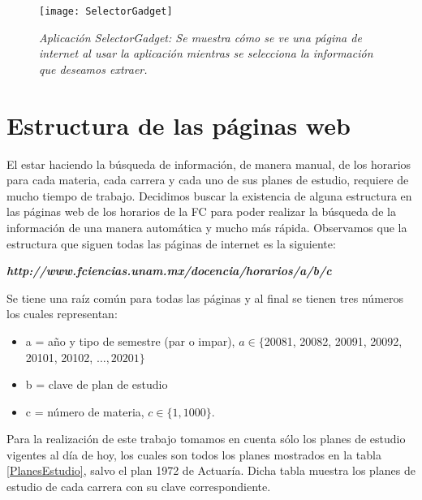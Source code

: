 \begin{figure}[H]
\centering
\texttt{[image: SelectorGadget]} %
\caption[\textit{Aplicación SelectorGadget}]{\textit{Aplicación SelectorGadget: Se muestra cómo se ve una página de internet al usar la aplicación mientras se selecciona la información que deseamos extraer.}}\label{appSelectorGadget}
\end{figure}

\section{Estructura de las páginas web}

El estar haciendo la búsqueda de información, de manera manual, de los horarios para cada materia, cada carrera y cada uno de sus planes de estudio, requiere de mucho tiempo de trabajo. Decidimos buscar la existencia de alguna estructura en las páginas web de los horarios de la FC para poder realizar la búsqueda de la información de una manera automática y mucho más rápida. Observamos que la estructura que siguen todas las páginas de internet es la siguiente:

\begin{center}
\textit{\textbf{http://www.fciencias.unam.mx/docencia/horarios/a/b/c}}
\end{center}

Se tiene una raíz común para todas las páginas y al final se tienen tres números los cuales representan:

\begin{itemize}
\item[ ] a = año y tipo de semestre (par o impar), $a \in \{$20081, 20082, 20091, 20092, 20101, 20102, $\ldots, 20201\}$

\item[ ] b = clave de plan de estudio

\item[ ] c = número de materia, $c \in \{1,1000\}$.
\end{itemize}

Para la realización de este trabajo tomamos en cuenta sólo los planes de estudio vigentes al día de hoy, los cuales son todos los planes mostrados en la tabla \tablename{\ref{PlanesEstudio}}, salvo el plan 1972 de Actuaría. Dicha tabla muestra los planes de estudio de cada carrera con su clave correspondiente.

